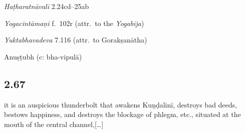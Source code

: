 \begin{ekdosis}
\begin{sources}[hp02_066]
\begin{versinnote}
\end{versinnote}
\end{sources}

\begin{testimonia}[hp02_066]
\emph{Haṭharatnāvalī} 2.24cd–25ab

\begin{versinnote}
\end{versinnote}

\emph{Yogacintāmaṇi} f.~102r (attr.~to the \emph{Yogabīja})

\begin{versinnote}
\end{versinnote}

\emph{Yuktabhavadeva} 7.116 (attr.~to Gorakṣanātha)
\begin{versinnote}
\end{versinnote}

\end{testimonia}


\begin{metre}[hp02_066]
Anuṣṭubh (c: bha-vipulā)
\end{metre}

\subsection*{2.67}
\begin{translation}[hp02_067]
it is an auspicious thunderbolt that awakens Kuṇḍalinī, destroys bad deeds, bestows happiness, and destroys the blockage of phlegm, etc., situated at the mouth of the central channel,[\dots]
\end{translation}


\end{ekdosis}
